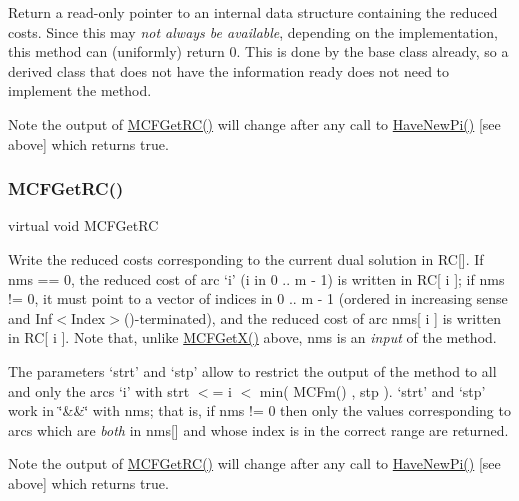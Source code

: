 Return a read-\/only pointer to an internal data structure containing the reduced costs. Since this may {\itshape not always be available}, depending on the implementation, this method can (uniformly) return 0. This is done by the base class already, so a derived class that does not have the information ready does not need to implement the method.

\begin{DoxyNote}{Note}
the output of \mbox{\hyperlink{class_m_c_f_class_af027cee8179a876a4879c73820c380d1}{M\+C\+F\+Get\+R\+C()}} will change after any call to \mbox{\hyperlink{class_m_c_f_class_a87b2b6516a7874ac55145312bd2d55bb}{Have\+New\+Pi()}} \mbox{[}see above\mbox{]} which returns true. 
\end{DoxyNote}
\mbox{\label{class_m_c_f_cplex_a361d84ae42041fdbf3824d45fc4c54aa}} 
\subsubsection{\texorpdfstring{M\+C\+F\+Get\+R\+C()}{MCFGetRC()}\hspace{0.1cm}{\footnotesize\ttfamily [3/5]}}
{\footnotesize\ttfamily virtual void M\+C\+F\+Get\+RC}

Write the reduced costs corresponding to the current dual solution in RC\mbox{[}\mbox{]}. If nms == 0, the reduced cost of arc `i' (i in 0 .. m -\/ 1) is written in RC\mbox{[} i \mbox{]}; if nms != 0, it must point to a vector of indices in 0 .. m -\/ 1 (ordered in increasing sense and Inf$<$\+Index$>$()-\/terminated), and the reduced cost of arc nms\mbox{[} i \mbox{]} is written in RC\mbox{[} i \mbox{]}. Note that, unlike \mbox{\hyperlink{class_m_c_f_class_a4eb307e0707adaef99bb0e08c9e10eb8}{M\+C\+F\+Get\+X()}} above, nms is an {\itshape input} of the method.

The parameters `strt' and `stp' allow to restrict the output of the method to all and only the arcs `i' with strt $<$= i $<$ min( M\+C\+Fm() , stp ). `strt' and `stp' work in \char`\"{}\&\&\char`\"{} with nms; that is, if nms != 0 then only the values corresponding to arcs which are {\itshape both} in nms\mbox{[}\mbox{]} and whose index is in the correct range are returned.

\begin{DoxyNote}{Note}
the output of \mbox{\hyperlink{class_m_c_f_class_af027cee8179a876a4879c73820c380d1}{M\+C\+F\+Get\+R\+C()}} will change after any call to \mbox{\hyperlink{class_m_c_f_class_a87b2b6516a7874ac55145312bd2d55bb}{Have\+New\+Pi()}} \mbox{[}see above\mbox{]} which returns true. 
\end{DoxyNote}
\mbox{\label{class_m_c_f_cplex_a9cc0f8dbc79bf2fd7744a6ad32b3e985}} 
